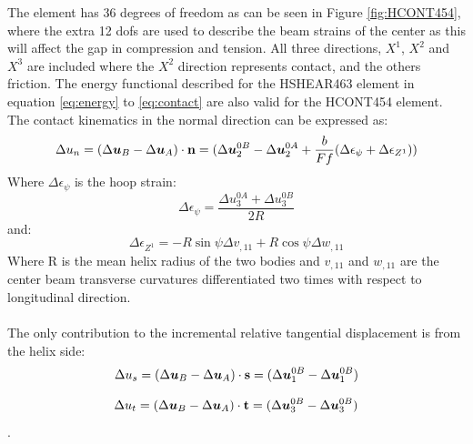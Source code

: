 The element has 36 degrees of freedom as can be seen in Figure \ref{fig:HCONT454},  where the extra 12 dofs are used to describe the beam strains of the center as this will affect the gap in compression and tension. All three directions, $X^1$, $X^2$ and $X^3$ are included where the $X^2$ direction represents contact, and the others friction. The energy functional described for the HSHEAR463 element in equation \ref{eq:energy} to \ref{eq:contact} are also valid for the HCONT454 element. The contact kinematics in the normal direction can be expressed as: 
\begin{equation}
    \Delta u_n=(\Delta \boldsymbol{u}_B-\Delta \boldsymbol{u}_A) \cdot \bold{n}=(\Delta \boldsymbol{u}_2^{0B}-\Delta \boldsymbol{u}_2^{0A}+\frac{b}{Ff}(\Delta \epsilon_\psi+\Delta \epsilon_{Z^1}))
\end{equation}
\noindent Where $ \Delta \epsilon_\psi$ is the hoop strain:
\begin{equation}
    \Delta \epsilon_\psi =\frac{\Delta u_3^{0A} + \Delta u_3^{0B}}{2R}
\end{equation}
and:
\begin{equation}
    \Delta \epsilon_{Z^1} = -R \sin \psi \Delta v_{,11} + R \cos \psi \Delta w_{,11}
\end{equation}
Where R is the mean helix radius of the two bodies and $v_{,11}$ and $w_{,11}$ are the center beam transverse curvatures differentiated  two times with respect to longitudinal direction. \\\\ The only contribution to the  incremental relative tangential displacement is from the helix side:
\begin{equation}
    \Delta u_s = (\Delta \boldsymbol{u}_B -\Delta \boldsymbol{u}_A) \cdot \bold{s}=(\Delta \boldsymbol{u}_1^{0B} -\Delta \boldsymbol{u}_1^{0B})
\end{equation}

\begin{equation}
    \Delta u_t = (\Delta \boldsymbol{u}_B -\Delta \boldsymbol{u}_A) \cdot \bold{t}=(\Delta \boldsymbol{u}_3^{0B} -\Delta \boldsymbol{u}_3^{0B})
\end{equation}. 

